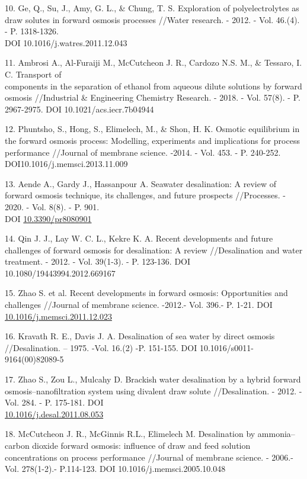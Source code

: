\begin{references}
10. Ge, Q., Su, J., Amy, G. L., \& Chung, T. S. Exploration of
polyelectrolytes as draw solutes in forward osmosis processes //Water
research. - 2012. - Vol. 46.(4). - P. 1318-1326.\\
DOI 10.1016/j.watres.2011.12.043

11. Ambrosi A., Al-Furaiji M., McCutcheon J. R., Cardozo N.S. M., \&
Tessaro, I. C. Transport of \\components in the separation of ethanol
from aqueous dilute solutions by forward osmosis //Industrial \&
Engineering Chemistry Research. - 2018. - Vol. 57(8). - P. 2967-2975.
DOI 10.1021/acs.iecr.7b04944

12. Phuntsho, S., Hong, S., Elimelech, M., \& Shon, H. K. Osmotic
equilibrium in the forward osmosis process: Modelling, experiments and
implications for process performance //Journal of membrane science.
-2014. - Vol. 453. - P. 240-252. DOI10.1016/j.memsci.2013.11.009

13. Aende A., Gardy J., Hassanpour A. Seawater desalination: A review of
forward osmosis technique, its challenges, and future prospects
//Processes. - 2020. - Vol. 8(8). - P. 901.\\
DOI \href{http://dx.doi.org/10.3390/pr8080901}{10.3390/pr8080901}

14. Qin J. J., Lay W. C. L., Kekre K. A. Recent developments and future
challenges of forward osmosis for desalination: A review //Desalination
and water treatment. - 2012. - Vol. 39(1-3). - P. 123-136. DOI
10.1080/19443994.2012.669167

15. Zhao S. et al. Recent developments in forward osmosis: Opportunities
and challenges //Journal of membrane science. -2012.- Vol. 396.- P.
1-21. DOI
\href{http://dx.doi.org/10.1016/j.memsci.2011.12.023}{10.1016/j.memsci.2011.12.023}

16. Kravath R. E., Davis J. A. Desalination of sea water by direct osmosis
//Desalination. -- 1975. -Vol. 16.(2) -P. 151-155. DOI
10.1016/s0011-9164(00)82089-5~

17. Zhao S., Zou L., Mulcahy D. Brackish water desalination by a hybrid
forward osmosis--nanofiltration system using divalent draw solute
//Desalination. - 2012. - Vol. 284. - P. 175-181. DOI
\\\href{http://dx.doi.org/10.1016/j.desal.2011.08.053}{10.1016/j.desal.2011.08.053}

18. McCutcheon J. R., McGinnis R.L., Elimelech M. Desalination by
ammonia--carbon dioxide forward osmosis: influence of draw and feed
solution concentrations on process performance //Journal of membrane
science. - 2006.-Vol. 278(1-2).- P.114-123. DOI 10.1016/j.memsci.2005.10.048


\end{references}
